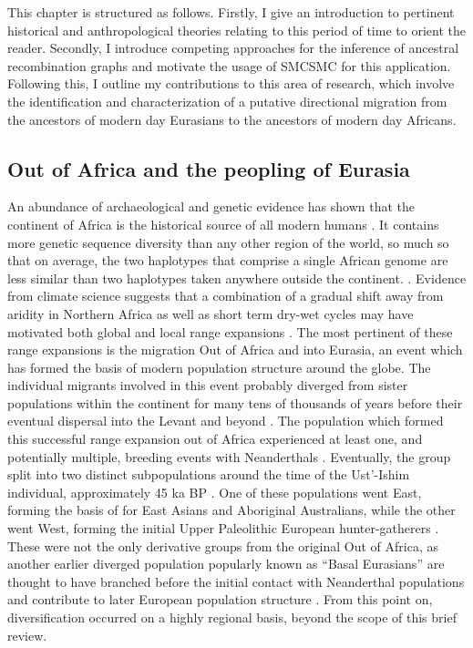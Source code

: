 This chapter is structured as follows. Firstly, I give an introduction to pertinent historical and anthropological theories relating to this period of time to orient the reader. Secondly, I introduce competing approaches for the inference of ancestral recombination graphs and motivate the usage of SMCSMC for this application. Following this, I outline my contributions to this area of research, which involve the identification and characterization of a putative directional migration from the ancestors of modern day Eurasians to the ancestors of modern day Africans. 


\subsection{Out of Africa and the peopling of Eurasia}

An abundance of archaeological and genetic evidence has shown that the continent of Africa is the historical source of all modern humans \cite{Lopez2015}. It contains more genetic sequence diversity than any other region of the world, so much so that on average, the two haplotypes that comprise a single African genome are less similar than two haplotypes taken anywhere outside the continent. \cite{Mallick2016}. Evidence from climate science suggests that a combination of a gradual shift away from aridity in Northern Africa as well as short term dry-wet cycles may have motivated both global and local range expansions \cite{Schaebitz2021, Timmermann2016}. The most pertinent of these range expansions is the migration Out of Africa and into Eurasia, an event which has formed the basis of modern population structure around the globe. 
The individual migrants involved in this event probably diverged from sister populations within the continent for many tens of thousands of years before their eventual dispersal into the Levant and beyond \cite{Bergstrom2019, Schiffels2014}. The population which formed this successful range expansion out of Africa experienced at least one, and potentially multiple, breeding events with Neanderthals \cite{Sankararaman2012}. Eventually, the group split into two distinct subpopulations around the time of the Ust'-Ishim individual, approximately 45 ka BP \cite{Fu2014}. One of these populations went East, forming the basis of for East Asians and Aboriginal Australians, while the other went West, forming the initial Upper Paleolithic European hunter-gatherers \cite{Skoglund2017,Lipson2017}. These were not the only derivative groups from the original Out of Africa, as another earlier diverged population popularly known as ``Basal Eurasians'' are thought to have branched before the initial contact with Neanderthal populations and contribute to later European population structure \cite{Lazaridis2014}. From this point on, diversification occurred on a highly regional basis, beyond the scope of this brief review. 

